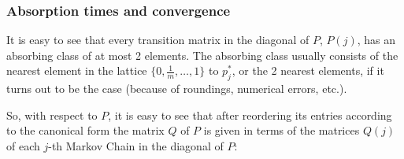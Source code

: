 \documentclass{article}
\begin{document}
\subsubsection*{Absorption times and convergence}
It is easy to see that every transition matrix in the diagonal of $P$, $P(j)$, has an absorbing class of at most 2 elements. The absorbing class usually consists of the nearest element in the lattice $\{0,\frac{1}{m}, \dots, 1\}$ to $p^*_j$, or the 2 nearest elements, if it turns out to be the case (because of roundings, numerical errors, etc.).\par
So, with respect to $P$, it is easy to see that after reordering its entries according to the canonical form the matrix $Q$ of $P$ is given in terms of the matrices $Q(j)$ of each $j$-th Markov Chain in the diagonal of $P$:
\end{document}
